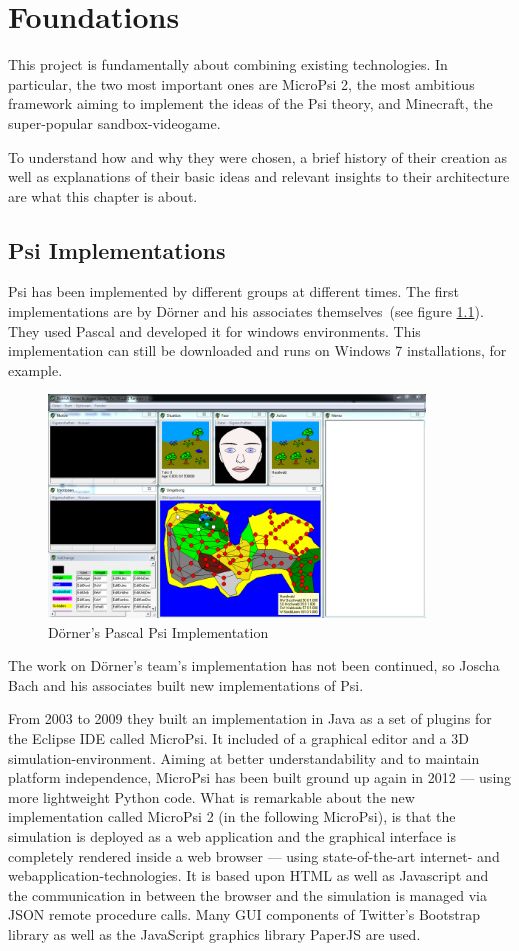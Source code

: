 \chapter{Foundations}
This project is fundamentally about combining existing technologies. In particular, the two most important ones are MicroPsi 2, the most ambitious framework aiming to implement the ideas of the Psi theory, and Minecraft, the super-popular sandbox-videogame.

To understand how and why they were chosen, a brief history of their creation as well as explanations of their basic ideas and relevant insights to their architecture are what this chapter is about.

    \section{Psi Implementations}
Psi has been implemented by different groups at different times. The first implementations are by Dörner and his associates themselves~(see figure \ref{psi_screen}). They used Pascal and developed it for windows environments. This implementation can still be downloaded and runs on Windows 7 installations, for example.

\begin{figure}[h]
  \centering
    \includegraphics[width=10cm]{graphics/psi_screen1}
  \caption{Dörner's Pascal Psi Implementation}
  \label{psi_screen}
\end{figure}

The work on Dörner's team's implementation has not been continued, so Joscha Bach and his associates built new implementations of Psi.

From 2003 to 2009 they built an implementation in Java as a set of plugins for the Eclipse IDE called MicroPsi. It included of a graphical editor and a 3D simulation-environment. Aiming at better understandability and to maintain platform independence, MicroPsi has been built ground up again in 2012 --- using more lightweight Python code. What is remarkable about the new implementation called MicroPsi 2 (in the following MicroPsi), is that the simulation is deployed as a web application and the graphical interface is completely rendered inside a web browser --- using state-of-the-art internet- and webapplication-technologies. It is based upon HTML as well as Javascript and the communication in between the browser and the simulation is managed via JSON remote procedure calls. Many GUI components of Twitter's Bootstrap library as well as the JavaScript graphics library PaperJS are used.~\cite{conf/agi/Bach12}

